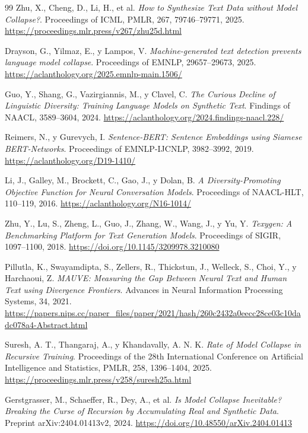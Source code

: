 \documentclass[12pt,letterpaper]{article}
\begin{document}
\begin{thebibliography}{99}
Zhu, X., Cheng, D., Li, H., et al.
\textit{How to Synthesize Text Data without Model Collapse?}.
Proceedings of ICML, PMLR, 267, 79746--79771, 2025.
\url{https://proceedings.mlr.press/v267/zhu25d.html}

Drayson, G., Yilmaz, E., y Lampos, V.
\textit{Machine-generated text detection prevents language model collapse}.
Proceedings of EMNLP, 29657--29673, 2025.
\url{https://aclanthology.org/2025.emnlp-main.1506/}

Guo, Y., Shang, G., Vazirgiannis, M., y Clavel, C.
\textit{The Curious Decline of Linguistic Diversity:
Training Language Models on Synthetic Text}.
Findings of NAACL, 3589--3604, 2024.
\url{https://aclanthology.org/2024.findings-naacl.228/}

Reimers, N., y Gurevych, I.
\textit{Sentence-BERT: Sentence Embeddings using Siamese BERT-Networks}.
Proceedings of EMNLP-IJCNLP, 3982--3992, 2019.
\url{https://aclanthology.org/D19-1410/}

Li, J., Galley, M., Brockett, C., Gao, J., y Dolan, B.
\textit{A Diversity-Promoting Objective Function for Neural Conversation Models}.
Proceedings of NAACL-HLT, 110--119, 2016.
\url{https://aclanthology.org/N16-1014/}

Zhu, Y., Lu, S., Zheng, L., Guo, J., Zhang, W., Wang, J., y Yu, Y.
\textit{Texygen: A Benchmarking Platform for Text Generation Models}.
Proceedings of SIGIR, 1097--1100, 2018.
\url{https://doi.org/10.1145/3209978.3210080}

Pillutla, K., Swayamdipta, S., Zellers, R., Thickstun, J.,
Welleck, S., Choi, Y., y Harchaoui, Z.
\textit{MAUVE: Measuring the Gap Between Neural Text and Human Text
using Divergence Frontiers}.
Advances in Neural Information Processing Systems, 34, 2021.
\url{https://papers.nips.cc/paper_files/paper/2021/hash/260c2432a0eecc28ce03c10dadc078a4-Abstract.html}

Suresh, A. T., Thangaraj, A., y Khandavally, A. N. K.
\textit{Rate of Model Collapse in Recursive Training}.
Proceedings of the 28th International Conference on Artificial Intelligence
and Statistics, PMLR, 258, 1396--1404, 2025.
\url{https://proceedings.mlr.press/v258/suresh25a.html}

Gerstgrasser, M., Schaeffer, R., Dey, A., et al.
\textit{Is Model Collapse Inevitable? Breaking the Curse of Recursion
by Accumulating Real and Synthetic Data}.
Preprint arXiv:2404.01413v2, 2024.
\url{https://doi.org/10.48550/arXiv.2404.01413}


\end{thebibliography}
\end{document}

